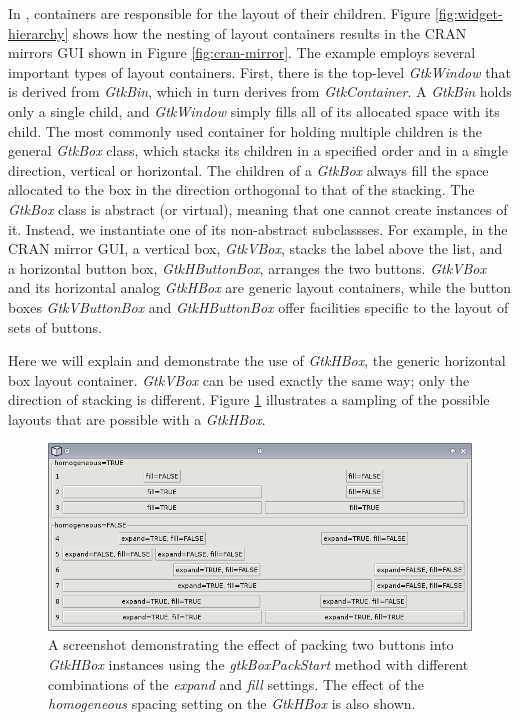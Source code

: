\documentclass[article]{jss}
\begin{document}
In , containers are responsible for the layout
of their children. Figure \ref{fig:widget-hierarchy} shows how the
nesting of 
layout containers results in the CRAN mirrors GUI shown in Figure 
\ref{fig:cran-mirror}. The example employs several important types of
layout containers. First, there is the top-level \emph{GtkWindow} that
is derived from \emph{GtkBin}, which in turn derives from
\emph{GtkContainer}.
A \emph{GtkBin} holds only a single child, and \emph{GtkWindow} simply
fills all
of its allocated space with its child. The most commonly used
container
for holding multiple children is the general \emph{GtkBox} class,
which stacks its children
in a specified order and in a single direction, vertical or
horizontal. The 
children of a \emph{GtkBox} always fill the space allocated to the box
in the direction orthogonal to that of the stacking. The \emph{GtkBox}
class is abstract (or virtual), meaning that one cannot create
instances of it. Instead, we instantiate one of its non-abstract
subclassses.  For example, in the CRAN mirror GUI, a vertical box,
\emph{GtkVBox}, stacks the label above the list, and a horizontal
button box, \emph{GtkHButtonBox},
arranges the two buttons. \emph{GtkVBox} and its horizontal analog
\emph{GtkHBox}
are generic layout containers, while the button boxes
\emph{GtkVButtonBox} and 
\emph{GtkHButtonBox} offer facilities specific to the layout of sets
of buttons.


Here we will explain and demonstrate the use of \emph{GtkHBox}, the
generic
horizontal box layout container. \emph{GtkVBox} can be used exactly
the same way;
only the direction of stacking is different. Figure \ref{fig:packing}
illustrates
a sampling of the possible layouts that are possible with a
\emph{GtkHBox}.

\begin{figure}
\begin{center}
\includegraphics{packing.png}
\caption{\label{fig:packing}A screenshot demonstrating the effect of
packing two
buttons into \emph{GtkHBox} instances using the \emph{gtkBoxPackStart}
method 
with different combinations of the \emph{expand} and \emph{fill}
settings. 
The effect of the \emph{homogeneous} spacing setting on the
\emph{GtkHBox} is 
also shown.}
\end{center}
\end{figure}
\end{document}
